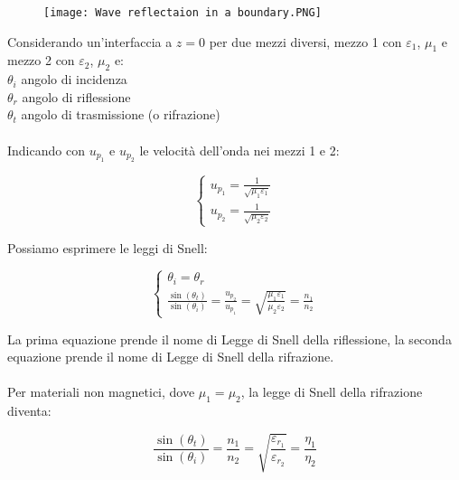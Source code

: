 \begin{figure}[h]
    \centering
    \texttt{[image: Wave reflectaion in a boundary.PNG]}
    
\end{figure} 

Considerando un'interfaccia a $z=0$ per due mezzi diversi, mezzo 1 con $\varepsilon_1$, $\mu_1$ e 
mezzo 2 con $\varepsilon_2$, $\mu_2$ e: \\ 

$\theta_i$ angolo di incidenza \\ 
$\theta_r$ angolo di riflessione \\ 
$\theta_t$ angolo di trasmissione (o rifrazione) \\ \\ 

Indicando con $u_{p_1}$ e $u_{p_2}$ le velocità dell'onda nei mezzi 1 e 2: 

{\Large \begin{equation}
    \begin{cases}
        u_{p_1} = \frac{1}{\sqrt{\mu_1 \varepsilon_1}}\\ 
        u_{p_2} = \frac{1}{\sqrt{\mu_2 \varepsilon_2}} 
    \end{cases}
\end{equation}} 

Possiamo esprimere le leggi di Snell: 

{\Large \begin{equation}
    \begin{cases}
        \theta_i = \theta_r \\ 
        \frac{\sin(\theta_t)}{\sin(\theta_i)} = \frac{u_{p_2}}{u_{p_1}} = 
        \sqrt{\frac{\mu_1 \varepsilon_1}{\mu_2 \varepsilon_2}} = \frac{n_1}{n_2}   
    \end{cases}
\end{equation}}

La prima equazione prende il nome di Legge di Snell della riflessione, 
la seconda equazione prende il nome di Legge di Snell della rifrazione. \\ \\ 

Per materiali non magnetici, dove $\mu_1 = \mu_2$, la legge di Snell della rifrazione diventa: 

{\Large \begin{equation}
    \frac{\sin(\theta_t)}{\sin(\theta_i)} = \frac{n_1}{n_2} = 
    \sqrt{\frac{\varepsilon_{r_1}}{\varepsilon_{r_2}}} = \frac{\eta_1}{\eta_2}
\end{equation}}

